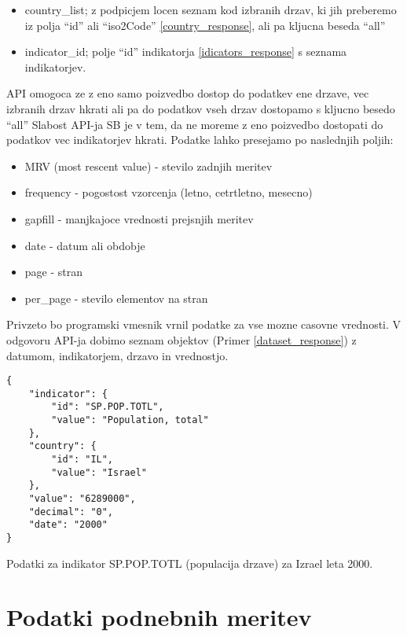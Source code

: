 \begin{itemize}
\item country\_list; z podpicjem locen seznam kod izbranih drzav, ki jih 
	  preberemo iz polja ``id'' ali ``iso2Code'' \ref{country_response}, ali pa 
      kljucna beseda ``all''
\item indicator\_id; polje ``id'' indikatorja \ref{idicators_response} s seznama
      indikatorjev.
\end{itemize}

API omogoca ze z eno samo poizvedbo dostop do podatkev ene drzave, vec izbranih 
drzav hkrati ali pa do podatkov vseh drzav dostopamo s kljucno besedo ``all''
Slabost API-ja SB je v tem, da ne moreme z eno poizvedbo dostopati do podatkov
vec indikatorjev hkrati. Podatke lahko presejamo po naslednjih poljih:
\begin{itemize}  
\item MRV (most rescent value) - stevilo zadnjih meritev
\item frequency - pogostost vzorcenja (letno, cetrtletno, mesecno)
\item gapfill - manjkajoce vrednosti prejsnjih meritev
\item date - datum ali obdobje
\item page - stran
\item per\_page - stevilo elementov na stran
\end{itemize}

Privzeto bo programski vmesnik vrnil podatke za vse mozne casovne 
vrednosti. V odgovoru API-ja dobimo seznam objektov (Primer
\ref{dataset_response}) z datumom, indikatorjem, drzavo in vrednostjo.


\begin{snippet}
\begin{center}
\begin{lstlisting}
{
    "indicator": {
        "id": "SP.POP.TOTL",
        "value": "Population, total"
    },
    "country": {
        "id": "IL",
        "value": "Israel"
    },
    "value": "6289000",
    "decimal": "0",
    "date": "2000"
}
\end{lstlisting}
\end{center}
\caption{Podatki za indikator SP.POP.TOTL (populacija drzave) za Izrael leta
2000.}
\label{dataset_response}
\end{snippet} 


\section{Podatki podnebnih meritev}

